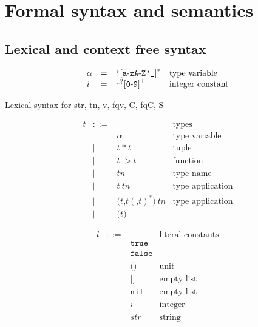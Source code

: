 \documentclass[12pt,a4paper]{book}
\newcommand{\TODO}[1]{{\color{red}#1}}
\newcommand{\gramsep}{|}
\begin{document}
\chapter{Formal syntax and semantics}

\section{Lexical and context free syntax}

\[
\begin{array}{lcll}
\alpha&=& \mbox{\texttt{'}[\texttt{a}-\texttt{z}\texttt{A}-\texttt{Z}\texttt{'}\texttt{\_}]}^*&\mbox{type variable}\\
i &=& \verb|~|^?\mbox{[\texttt{0}-\texttt{9}]}^+&\mbox{integer constant}\\
\end{array}
\]


\TODO{Lexical syntax for str, tn, v, fqv, C, fqC, S}

\[
\begin{array}{lcll}
t & ::= & &\mbox{types}\\
&&\alpha & \mbox{type variable}\\
& \gramsep& t\ \texttt{*}\ t & \mbox{tuple}\\
 &\gramsep &t\ \texttt{->}\ t&\mbox{function}\\
 &\gramsep& \mathit{tn}&\mbox{type name}\\
 &\gramsep&t\ \mathit{tn}&\mbox{type application}\\
 &\gramsep& \texttt{(}t\texttt{,}t(\texttt{,}t)^*\texttt{)}\ \mathit{tn}&\mbox{type application}\\
 &\gramsep&\texttt{(}t\texttt{)}
 \end{array}
 \]

 \[
\begin{array}{lcll}
l & ::= &&\mbox{literal constants}\\
&& \texttt{true}\\
&\gramsep& \texttt{false}\\
&\gramsep& \texttt{(}\texttt{)}&\mbox{unit}\\
&\gramsep& \texttt{[}\texttt{]}&\mbox{empty list}\\
&\gramsep& \texttt{nil}&\mbox{empty list}\\
&\gramsep& i &\mbox{integer}\\
&\gramsep& \textit{str} &\mbox{string}\\
 \end{array}
\]
\end{document}
